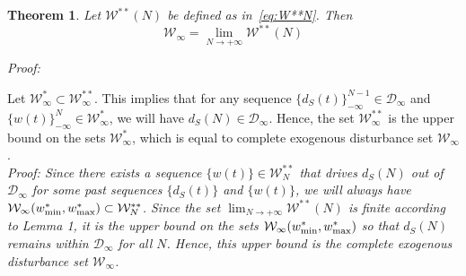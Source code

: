 \documentclass[letterpaper, 10 pt, conference]{ieeeconf}  %
\newtheorem{theorem}{Theorem}
\newcommand{\AB}[1]{\textbf{\color{magenta}{[AB: #1]}}}
\begin{document}
\begin{theorem}
Let $\mathcal{W}^{**}(N)$ be defined as in~\eqref{eq:W**N}. Then
\[
    \mathcal{W}_{\infty} = \lim_{N\rightarrow+\infty}\mathcal{W}^{**}(N)
\]
\end{theorem}
	\textit{Proof:} 
\AB{To be redone, according to new notation and Lemma 1}

{\color{gray}
Let $\mathcal{W}^{*}_{\infty} \subset \mathcal{W}^{**}_{\infty}$. This implies that for any sequence $\{d_S(t)\}_{-\infty}^{N-1} \in \mathcal{D}_{\infty}$ and $\{w(t)\}_{-\infty}^N \in \mathcal{W}^*_{\infty}$, we will have $d_S(N) \in \mathcal{D}_{\infty}$. Hence, the set $\mathcal{W}^{**}_{\infty}$ is the upper bound on the sets $\mathcal{W}^{*}_{\infty}$, which is equal to complete exogenous disturbance set $\mathcal{W}_{\infty}$. 
}\\
	\textit{Proof: Since there exists a sequence $\{w(t)\} \in \mathcal{W}^{**}_{N}$ that drives $d_S(N)$ out of $\mathcal{D}_{\infty}$ for some past sequences $\{d_S(t)\}$ and $\{w(t)\}$, we will always have $\mathcal{W}_{\infty}(w^*_{\rm min},w^*_{\rm max}) \subset \mathcal{W}^{**}_{N}$. Since the set $\lim_{N\rightarrow+\infty}\mathcal{W}^{**}(N)$ is finite according to Lemma 1, it is the upper bound on the sets $\mathcal{W}_{\infty}(w^*_{\rm min},w^*_{\rm max})$ so that $d_S(N)$ remains within $\mathcal{D}_{\infty}$ for all $N$. Hence, this upper bound is the complete exogenous disturbance set $\mathcal{W}_{\infty}$. } \hfill\QED
\end{document}
